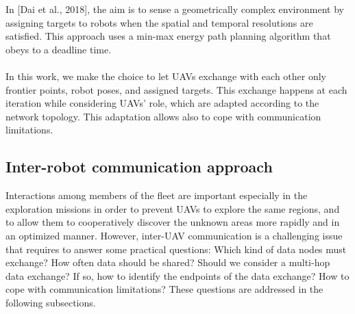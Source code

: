 \documentclass[11pt,openany]{book}
\begin{document}
In [Dai et al., 2018], the aim is to sense a geometrically complex environment by assigning targets to robots when the spatial and temporal resolutions are satisﬁed. This approach uses a min-max energy path planning algorithm that obeys to a deadline time.\\\\
In this work, we make the choice to let UAVs exchange with each other only frontier points, robot poses, and assigned targets. This exchange happens at each iteration while considering UAVs’ role, which are adapted according to the network topology. This adaptation allows also to cope with communication limitations.
\subsection{Inter-robot communication approach}
Interactions among members of the ﬂeet are important especially in the exploration missions in order to prevent UAVs to explore the same regions, and to allow them to cooperatively discover the unknown areas more rapidly and in an optimized manner. However, inter-UAV communication is a challenging issue that requires to answer some practical questions: Which kind of data nodes must exchange? How often data should be shared? Should we consider a multi-hop data exchange? If so, how to identify the endpoints of the data exchange? How to cope with communication limitations? These questions are addressed in the following subsections.
\end{document}
